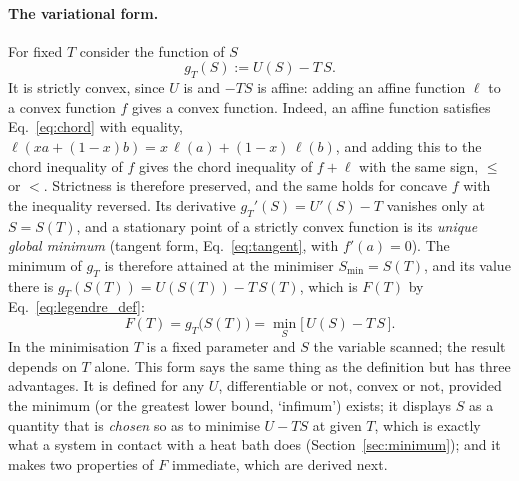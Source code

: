 \documentclass[10pt,a4paper]{article}
\theoremstyle{remark}
\begin{document}
\paragraph{The variational form.} For fixed $T$ consider the function of $S$
\[
  g_T(S):= U(S)-T\,S .
\]
It is strictly convex, since $U$ is and $-TS$ is affine: adding an affine
function $\ell$ to a convex function $f$ gives a convex function. Indeed, an
affine function satisfies Eq.~\eqref{eq:chord} with equality,
$\ell(xa+(1-x)b)=x\,\ell(a)+(1-x)\,\ell(b)$, and adding this to the chord
inequality of $f$ gives the chord inequality of $f+\ell$ with the same sign,
$\leq$ or $<$. Strictness is therefore preserved, and the same holds for
concave $f$ with the inequality reversed.
Its derivative $g_T'(S)=U'(S)-T$ vanishes only at $S=S(T)$, and a stationary
point of a strictly convex function is its \emph{unique global minimum}
(tangent form, Eq.~\eqref{eq:tangent}, with $f'(a)=0$). The minimum of $g_T$
is therefore attained at the minimiser $S_{\min}=S(T)$, and its value there is
$g_T(S(T))=U(S(T))-T\,S(T)$, which is $F(T)$ by Eq.~\eqref{eq:legendre_def}:
\begin{equation}\label{eq:legendre_inf}
  F(T)=g_T\big(S(T)\big)=\min_{S}\big[\,U(S)-T\,S\,\big] .
\end{equation}
In the minimisation $T$ is a fixed parameter and $S$ the variable scanned; the
result depends on $T$ alone. This form says the same thing as the definition
but has three advantages. It is defined for any $U$, differentiable or not,
convex or not, provided the minimum (or the greatest lower bound, `infimum') exists;
it displays $S$ as a quantity that is \emph{chosen} so as to minimise $U-TS$ at
given $T$, which is exactly what a system in contact with a heat bath does
(Section~\ref{sec:minimum}); and it makes two properties of $F$ immediate,
which are derived next.
\end{document}
